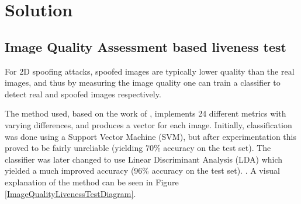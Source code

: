 \documentclass[10pt,a4paper]{article}
\begin{document}


\section{Solution}
    \subsection{Image Quality Assessment based liveness test}
        For 2D spoofing attacks, spoofed images are typically lower quality than the real images, and thus by measuring the image quality
        one can train a classifier to detect real and spoofed images respectively.

        The method used, based on the work of \citet{ImageQualityAssessmentTest}, implements 24 different metrics with varying differences, and produces
        a vector for each image. Initially, classification was done using a Support Vector Machine (SVM), but after experimentation this proved to be fairly
        unreliable (yielding 70\% accuracy on the test set). The classifier was later changed to use Linear Discriminant Analysis (LDA) which yielded a much improved
        accuracy (96\% accuracy on the test set). .
        A visual explanation of the method can be seen in Figure \ref{ImageQualityLivenessTestDiagram}. 

\end{document}
